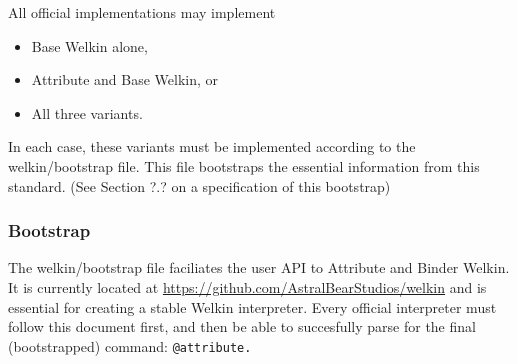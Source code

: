 All official implementations may implement
\begin{itemize}
\item Base Welkin alone,
\item Attribute and Base Welkin, or
\item All three variants.
\end{itemize}

In each case, these variants must be implemented according to the welkin/bootstrap file. This file bootstraps the essential information from this standard. (See Section ?.? on a specification of this bootstrap)




\subsubsection{Bootstrap}
The welkin/bootstrap file faciliates the user API to Attribute and Binder Welkin. It is currently located at \url{https://github.com/AstralBearStudios/welkin} and is essential for creating a stable Welkin interpreter. Every official interpreter must follow this document first, and then be able to succesfully parse for the final (bootstrapped) command: \texttt{@attribute.}



